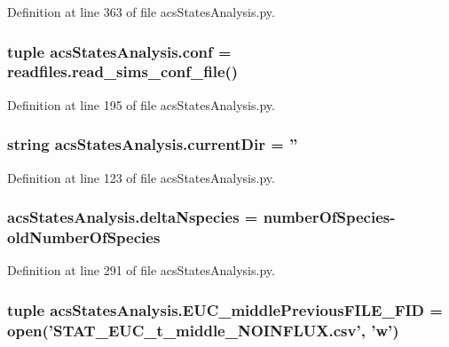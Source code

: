 Definition at line 363 of file acs\-States\-Analysis.\-py.

\hypertarget{a00130_ab8d1341009c3207d501833ef63593ffa}{
\subsubsection[{conf}]{\setlength{\rightskip}{0pt plus 5cm}tuple acs\-States\-Analysis.\-conf = readfiles.\-read\-\_\-sims\-\_\-conf\-\_\-file()}}\label{a00130_ab8d1341009c3207d501833ef63593ffa}


Definition at line 195 of file acs\-States\-Analysis.\-py.

\hypertarget{a00130_ae98225d5c8c20399f5c3b888fa37746f}{
\subsubsection[{current\-Dir}]{\setlength{\rightskip}{0pt plus 5cm}string acs\-States\-Analysis.\-current\-Dir = ''}}\label{a00130_ae98225d5c8c20399f5c3b888fa37746f}


Definition at line 123 of file acs\-States\-Analysis.\-py.

\hypertarget{a00130_a555117703c3245ec7d3d73f5d991c8c5}{
\subsubsection[{delta\-Nspecies}]{\setlength{\rightskip}{0pt plus 5cm}acs\-States\-Analysis.\-delta\-Nspecies = number\-Of\-Species-\/{\bf old\-Number\-Of\-Species}}}\label{a00130_a555117703c3245ec7d3d73f5d991c8c5}


Definition at line 291 of file acs\-States\-Analysis.\-py.

\hypertarget{a00130_afcb9ec3ed11cfcacae8f796af7605425}{
\subsubsection[{E\-U\-C\-\_\-middle\-Previous\-F\-I\-L\-E\-\_\-\-F\-I\-D}]{\setlength{\rightskip}{0pt plus 5cm}tuple acs\-States\-Analysis.\-E\-U\-C\-\_\-middle\-Previous\-F\-I\-L\-E\-\_\-\-F\-I\-D = open('S\-T\-A\-T\-\_\-\-E\-U\-C\-\_\-t\-\_\-middle\-\_\-\-N\-O\-I\-N\-F\-L\-U\-X.\-csv', 'w')}}\label{a00130_afcb9ec3ed11cfcacae8f796af7605425}


